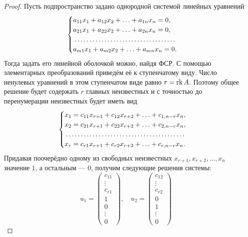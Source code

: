 \begin{proof}
    Пусть подпространство задано однородной системой линейных уравнений
    \[
        \begin{cases}
            a_{11}x_1 + a_{12}x_2 + \ldots + a_{1n}x_n = 0,\\
            a_{21}x_1 + a_{22}x_2 + \ldots + a_{2n}x_n = 0,\\
            \dotfill\\
            a_{m1}x_1 + a_{m2}x_2 + \ldots + a_{mn}x_n = 0.
        \end{cases}
    \]
    Тогда задать его линейной оболочкой можно, найдя ФСР. С помощью элементарных преобразований приведём её к ступенчатому виду. Число ненулевых уравнений в этом ступенчатом виде равно $r = \operatorname{rk} A$. Поэтому общее решение будет содержать $r$ главных неизвестных и с точностью до перенумерации неизвестных будет иметь вид
    \[
        \begin{cases}
            x_1 = c_{11}x_{r + 1} + c_{12}x_{r + 2} + \ldots + c_{1, n - r}x_n,\\
            x_2 = c_{21}x_{r + 1} + c_{22}x_{r + 2} + \ldots + c_{2, n - r}x_n,\\
            \dotfill\\
            x_r = c_{r1}x_{r + 1} + c_{r2}x_{r + 2} + \ldots + c_{r, n - r}x_n.\\
        \end{cases}
    \]
    Придавая поочерёдно одному из свободных неизвестных $x_{r + 1}, x_{r + 2}, \ldots, x_n$ значение $1$, а остальным --- $0$, получим следующие решения системы:
    \[
        u_1 = 
        \begin{pmatrix}
            c_{11}\\
            \vdots\\
            c_{r1}\\
            1\\
            0\\
            \vdots\\
            0
        \end{pmatrix},\quad
        u_2 = 
        \begin{pmatrix}
            c_{12}\\
            \vdots\\
            c_{r2}\\
            0\\
            1\\
            \vdots\\
            0

\end{pmatrix}\]
\end{proof}
